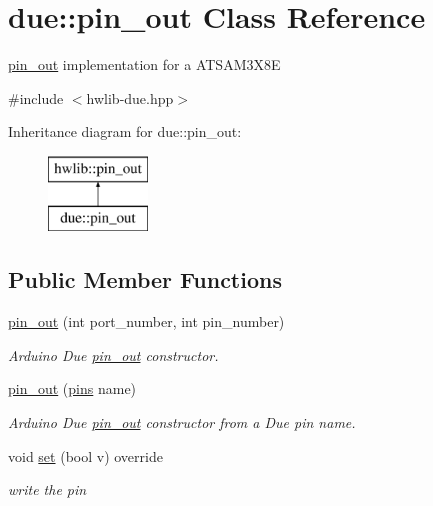\hypertarget{classdue_1_1pin__out}{}\section{due\+:\+:pin\+\_\+out Class Reference}
\label{classdue_1_1pin__out}


\hyperlink{classdue_1_1pin__out}{pin\+\_\+out} implementation for a A\+T\+S\+A\+M3\+X8E  




{\ttfamily \#include $<$hwlib-\/due.\+hpp$>$}

Inheritance diagram for due\+:\+:pin\+\_\+out\+:\begin{figure}[H]
\begin{center}
\leavevmode
\includegraphics[height=2.000000cm]{classdue_1_1pin__out}
\end{center}
\end{figure}
\subsection*{Public Member Functions}
\begin{DoxyCompactItemize}
\item 
\hyperlink{classdue_1_1pin__out_aed112fcb4fa183b5114eeb90385b03f3}{pin\+\_\+out} (int port\+\_\+number, int pin\+\_\+number)
\begin{DoxyCompactList}\small\item\em Arduino Due \hyperlink{classdue_1_1pin__out}{pin\+\_\+out} constructor. \end{DoxyCompactList}\item 
\hyperlink{classdue_1_1pin__out_ad0ede1c3e5e7501ae0dd045d83578c6c}{pin\+\_\+out} (\hyperlink{namespacedue_a8ffa3ec309934ff9db34317e504bcc92}{pins} name)
\begin{DoxyCompactList}\small\item\em Arduino Due \hyperlink{classdue_1_1pin__out}{pin\+\_\+out} constructor from a Due pin name. \end{DoxyCompactList}\item 
void \hyperlink{classdue_1_1pin__out_a65a516d8139c1efb217d90f5bdffe0a4}{set} (bool v) override
\begin{DoxyCompactList}\small\item\em write the pin \end{DoxyCompactList}\end{DoxyCompactItemize}


